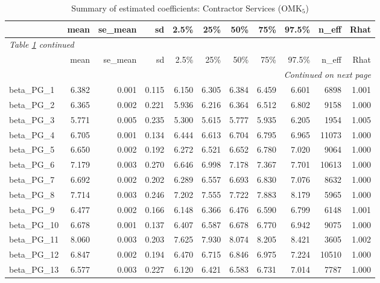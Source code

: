 \documentclass[12pt]{article}
\begin{document}
\begingroup
\footnotesize
\setlength{\tabcolsep}{3pt}
\begin{longtable}{lrrrrrrrrrr}
\caption{Summary of estimated coefficients: Contractor Services (OMK$_\text{5}$)}
\label{tab:coef_summary_omk5} \\
\toprule
 & mean & se\_mean & sd & 2.5\% & 25\% & 50\% & 75\% & 97.5\% & n\_eff & Rhat \\
\midrule
\endfirsthead
\multicolumn{11}{l}{\textit{Table \ref{tab:coef_summary_omk5} continued}} \\
\toprule
 & mean & se\_mean & sd & 2.5\% & 25\% & 50\% & 75\% & 97.5\% & n\_eff & Rhat \\
\midrule
\endhead
\midrule
\multicolumn{11}{r}{\textit{Continued on next page}} \\
\endfoot
\bottomrule
\endlastfoot
beta\_PG\_1   &  6.382 & 0.001 & 0.115 &  6.150 &  6.305 &  6.384 &  6.459 &  6.601 &  6898 & 1.001 \\
beta\_PG\_2   &  6.365 & 0.002 & 0.221 &  5.936 &  6.216 &  6.364 &  6.512 &  6.802 &  9158 & 1.000 \\
beta\_PG\_3   &  5.771 & 0.005 & 0.235 &  5.300 &  5.615 &  5.777 &  5.935 &  6.205 &  1954 & 1.005 \\
beta\_PG\_4   &  6.705 & 0.001 & 0.134 &  6.444 &  6.613 &  6.704 &  6.795 &  6.965 & 11073 & 1.000 \\
beta\_PG\_5   &  6.650 & 0.002 & 0.192 &  6.272 &  6.521 &  6.652 &  6.780 &  7.020 &  9064 & 1.000 \\
beta\_PG\_6   &  7.179 & 0.003 & 0.270 &  6.646 &  6.998 &  7.178 &  7.367 &  7.701 & 10613 & 1.000 \\
beta\_PG\_7   &  6.692 & 0.002 & 0.202 &  6.289 &  6.557 &  6.693 &  6.830 &  7.076 &  8632 & 1.000 \\
beta\_PG\_8   &  7.714 & 0.003 & 0.246 &  7.202 &  7.555 &  7.722 &  7.883 &  8.179 &  5965 & 1.000 \\
beta\_PG\_9   &  6.477 & 0.002 & 0.166 &  6.148 &  6.366 &  6.476 &  6.590 &  6.799 &  6148 & 1.001 \\
beta\_PG\_10  &  6.678 & 0.001 & 0.137 &  6.407 &  6.587 &  6.678 &  6.770 &  6.942 &  9075 & 1.000 \\
beta\_PG\_11  &  8.060 & 0.003 & 0.203 &  7.625 &  7.930 &  8.074 &  8.205 &  8.421 &  3605 & 1.002 \\
beta\_PG\_12  &  6.847 & 0.002 & 0.194 &  6.470 &  6.715 &  6.846 &  6.975 &  7.224 & 10510 & 1.000 \\
beta\_PG\_13  &  6.577 & 0.003 & 0.227 &  6.120 &  6.421 &  6.583 &  6.731 &  7.014 &  7787 & 1.000 \\

\end{longtable}
\end{document}
